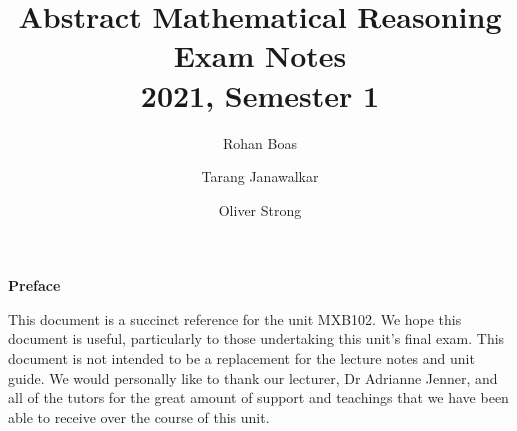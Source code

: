 \documentclass{article}
\title{\textbf{Abstract Mathematical Reasoning}
    \texorpdfstring{\\}{ } {\large Exam Notes}
    \texorpdfstring{\\}{ } {\normalsize 2021, Semester 1}}
\author{
    Rohan Boas \and Tarang Janawalkar \and Oliver Strong
}
\date{}
\theoremstyle{plain}
\numberwithin{theorem}{subsection}
\theoremstyle{definition}
\numberwithin{definition}{subsection}
\theoremstyle{remark}
\numberwithin{note}{subsection}
\begin{document}
\begin{titlepage}
    \maketitle
    \thispagestyle{empty}
    \vspace*{\fill}
    \begin{adjustwidth}{4cm}{4cm}
        {\Large\bf Preface}
        \vspace{0.7em}

        This document is a succinct reference for the unit MXB102.
        We hope this document is useful, particularly to those undertaking this unit's final exam.
        This document is not intended to be a replacement for the lecture notes and unit guide.
        We would personally like to thank our lecturer, Dr Adrianne Jenner,
        and all of the tutors for the great amount of support and teachings
        that we have been able to receive over the course of this unit.
    \end{adjustwidth}
    \vspace*{\fill}
    \doclicenseThis
    \thispagestyle{empty}
\end{titlepage}

\newpage
\end{document}
